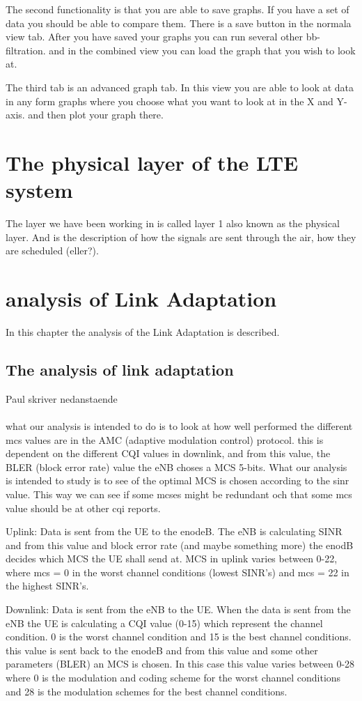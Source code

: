 \documentclass[cropmarks, frame, english]{idamasterthesis}
\begin{document}
The second functionality is that you are able to save graphs. If you have a set of data you should be able to compare them. There is a save button in the normala view tab. After you have saved your graphs you can run several other bb-filtration. and in the combined view you can load the graph that you wish to look at.

The third tab is an advanced graph tab. In this view you are able to look at data in any form graphs where you choose what you want to look at in the X and Y-axis. and then plot your graph there.
\chapter{The physical layer of the LTE system}
The layer we have been working in is called layer 1 also known as the physical layer. And is the description of how the signals are sent through the air, how they are scheduled (eller?).
 
\chapter{analysis of Link Adaptation}
In this chapter the analysis of the Link Adaptation is described. 

\section{The analysis of link adaptation}
Paul skriver nedanstaende \\ \\
what our analysis is intended to do is to look at how well performed the different mcs values are in the AMC (adaptive modulation control) protocol. this is dependent on the different CQI values in downlink, and from this value, the BLER (block error rate) value the eNB choses a MCS 5-bits. What our analysis is intended to study is to see of the optimal MCS is chosen according to the sinr value. This way we can see if some mcses might be redundant och that some mcs value should be at other cqi reports. 

Uplink: \newline
Data is sent from the UE to the enodeB. The eNB is calculating SINR and from this value and block error rate (and maybe something more) the enodB decides which MCS the UE shall send at. MCS in uplink varies between 0-22, where mcs = 0 in the worst channel conditions (lowest SINR's) and mcs = 22 in the highest SINR's. 

Downlink: \newline
Data is sent from the eNB to the UE. When the data is sent from the eNB the UE is calculating a CQI value (0-15) which represent the channel condition. 0 is the worst channel condition and 15 is the best channel conditions. this value is sent back to the enodeB and from this value and some other parameters (BLER) an MCS is chosen. In this case this value varies between 0-28 where 0 is the modulation and coding scheme for the worst channel conditions and 28 is the modulation schemes for the best channel conditions.
\end{document}

